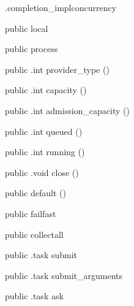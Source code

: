 \begin{CrexxClass}{.completion\_impl}{concurrency}

  \begin{Hierarchy}
  \end{Hierarchy}

  \begin{Members}

    \Factory
      {public}
      {local}
      {}

    \Factory
      {public}
      {process}
      {}

    \Method
      {public}
      {.int}
      {provider\_type}
      {()}

    \Method
      {public}
      {.int}
      {capacity}
      {()}

    \Method
      {public}
      {.int}
      {admission\_capacity}
      {()}

    \Method
      {public}
      {.int}
      {queued}
      {()}

    \Method
      {public}
      {.int}
      {running}
      {()}

    \Method
      {public}
      {.void}
      {close}
      {()}

    \Factory
      {public}
      {default}
      {()}

    \Factory
      {public}
      {failfast}
      {}

    \Factory
      {public}
      {collectall}
      {}

    \Method
      {public}
      {.task}
      {submit}
      {}

    \Method
      {public}
      {.task}
      {submit\_arguments}
      {}

    \Method
      {public}
      {.task}
      {ask}
      {}


\end{Members}
\end{CrexxClass}
